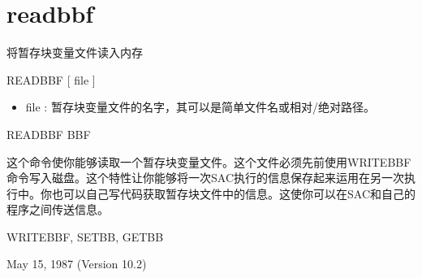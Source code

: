 \section{readbbf}
\label{cmd:readbbf}

将暂存块变量文件读入内存

READBBF [ file ]

\begin{itemize}
\item file : 暂存块变量文件的名字，其可以是简单文件名或相对/绝对路径。
\end{itemize}

READBBF BBF

这个命令使你能够读取一个暂存块变量文件。这个文件必须先前使用WRITEBBF命令写入磁盘。这个特性让你能够将一次SAC执行的信息保存起来运用在另一次执行中。你也可以自己写代码获取暂存块文件中的信息。这使你可以在SAC和自己的程序之间传送信息。

WRITEBBF, SETBB, GETBB

May 15, 1987 (Version 10.2)

